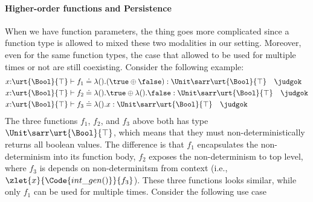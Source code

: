 \paragraph{Higher-order functions and Persistence}
When we have function parameters, the thing goes more complicated since a function type is allowed to mixed these two modalities in our setting. Moreover, even for the same function types, the case that allowed to be used for multiple times or not are still coexisting. Consider the following example:
\begin{align*}
  &x{:}\urt{\Bool}{\top} \vdash f_1 \doteq \lambda ().(\true \oplus \false) : \Unit\sarr\urt{\Bool}{\top} \quad \judgok
  \\&x{:}\urt{\Bool}{\top} \vdash f_2 \doteq \lambda ().\true \oplus \lambda ().\false : \Unit\sarr\urt{\Bool}{\top} \quad \judgok 
  \\&x{:}\urt{\Bool}{\top} \vdash f_3 \doteq \lambda ().x : \Unit\sarr\urt{\Bool}{\top} \quad \judgok
\end{align*}\noindent
The three functions $f_1$, $f_2$, and $f_3$ above both has type $\Unit\sarr\urt{\Bool}{\top}$, which means that they must non-deterministically returns all boolean values. The difference is that $f_1$ encapsulates the non-determinism into its function body, $f_2$ exposes the non-determinism to top level, where $f_3$ is depends on non-determinitsm from context (i.e., $\zlet{x}{\Code{int\_gen()}}{f_3}$). These three functions looks similar, while only $f_1$ can be used for multiple times. Consider the following use case 
